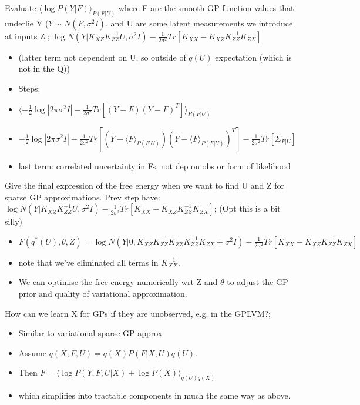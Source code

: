 \documentclass{article}
\begin{document}
Evaluate $\langle \log P(Y|F)\rangle_{P(F|U)}$ where F are the smooth GP function values that underlie Y ($Y\sim N(F, \sigma^2I)$, and U are some latent measurements we introduce at inputs Z.; $\log N(Y|K_{XZ}K_{ZZ}^{-1}U, \sigma^2I)-\frac{1}{2\sigma^2}Tr[K_{XX}-K_{XZ}K_{ZZ}^{-1}K_{ZX}]$ \begin{itemize} \item (latter term not dependent on U, so outside of $q(U)$ expectation (which is not in the Q)) \item Steps: \item $\langle -\frac{1}{2}\log|2\pi\sigma^2I|-\frac{1}{2\sigma^2}Tr[(Y-F)(Y-F)^T]\rangle_{P(F|U)}$ \item $-\frac{1}{2}\log|2\pi\sigma^2I|-\frac{1}{2\sigma^2}Tr[(Y-\langle F\rangle_{P(F|U)})(Y-\langle F\rangle_{P(F|U)})^T]-\frac{1}{2\sigma^2}Tr[\Sigma_{F|U}]$ \item last term: correlated uncertainty in Fs, not dep on obs or form of likelihood \end{itemize}

Give the final expression of the free energy when we want to find U and Z for sparse GP approximations. Prev step have: $\log N(Y|K_{XZ}K_{ZZ}^{-1}U, \sigma^2I)-\frac{1}{2\sigma^2}Tr[K_{XX}-K_{XZ}K_{ZZ}^{-1}K_{ZX}]$; (Opt this is a bit silly)  \begin{itemize} \item $F(q^*(U), \theta, Z)=\log N(Y|0, K_{XZ}K^{-1}_{ZZ}K_{ZZ}K_{ZZ}^{-1}K_{ZX}+\sigma^2I) -\frac{1}{2\sigma^2}Tr[K_{XX}-K_{XZ}K_{ZZ}^{-1}K_{ZX}]$ \item note that we've eliminated all terms in $K_{XX}^{-1}$. \item We can optimise the free energy numerically  wrt Z and $\theta$ to adjust the GP prior and quality of variational approximation. \end{itemize}

How can we learn X for GPs if they are unobserved, e.g. in the GPLVM?; \begin{itemize} \item Similar to variational sparse GP approx \item Assume $q(X, F, U)=q(X)P(F|X, U)q(U)$. \item Then $F=\langle \log P(Y, F, U|X) + \log P(X)\rangle_{q(U)q(X)}$  \item which simplifies into tractable components in much the same way as above. \end{itemize}
\end{document}
